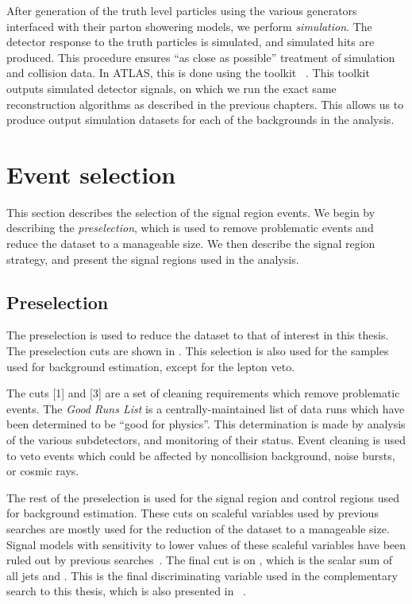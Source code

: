 After generation of the truth level particles using the various generators interfaced with their parton showering models, we perform \textit{simulation}.
The detector response to the truth particles is simulated, and simulated hits are produced.
This procedure ensures ``as close as possible'' treatment of simulation and collision data.
In ATLAS, this is done using the \GEANTFour toolkit ~\cite{Agostinelli:2002hh}.
This toolkit outputs simulated detector signals, on which we run the exact same reconstruction algorithms as described in the previous chapters.
This allows us to produce output simulation datasets for each of the backgrounds in the analysis.

\section{Event selection}

This section describes the selection of the signal region events.
We begin by describing the \textit{preselection}, which is used to remove problematic events and reduce the dataset to a manageable size.
We then describe the signal region strategy, and present the signal regions used in the analysis.

\subsection{Preselection}

The preselection is used to reduce the dataset to that of interest in this thesis.
The preselection cuts are shown in .
This selection is also used for the samples used for background estimation, except for the lepton veto.

The cuts [1] and [3] are a set of cleaning requirements which remove problematic events.
The \textit{Good Runs List} is a centrally-maintained list of data runs which have been determined to be ``good for physics''.
This determination is made by analysis of the various subdetectors, and monitoring of their status.
Event cleaning is used to veto events which could be affected by noncollision background, noise bursts, or cosmic rays.

The rest of the preselection is used for the signal region and control regions used for background estimation.
These cuts on scaleful variables used by previous searches are mostly used for the reduction of the dataset to a manageable size.
Signal models with sensitivity to lower values of these scaleful variables have been ruled out by previous searches~\cite{SUSY-2015-06}.
The final cut is on \meff, which is the scalar sum of all jets and \met.
This is the final discriminating variable used in the complementary search to this thesis, which is also presented in ~\cite{ATLAS-CONF-2016-078}.

